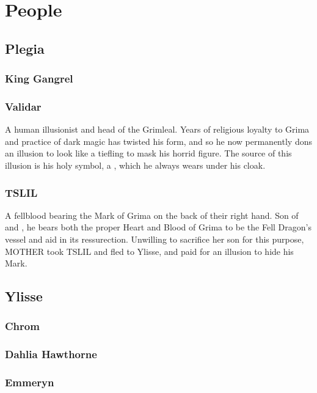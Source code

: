 
\section{People}
\subsection{Plegia}
\subsubsection{King Gangrel}
\label{people:gangrel}

\subsubsection{Validar}
\label{people:validar}
A human illusionist and head of the Grimleal. Years of religious loyalty to Grima and practice of dark magic has twisted his form, and so he now permanently dons an illusion to look like a tiefling to mask his horrid figure. The source of this illusion is his holy symbol, a , which he always wears under his cloak.


\subsubsection{TSLIL}
\label{people:tslil}
A fellblood bearing the Mark of Grima on the back of their right hand. Son of  and , he bears both the proper Heart and Blood of Grima to be the Fell Dragon's vessel and aid in its ressurection. Unwilling to sacrifice her son for this purpose, MOTHER took TSLIL and fled to Ylisse, and paid for an illusion to hide his Mark. 

\subsection{Ylisse}
\subsubsection{Chrom}
\label{people:chrom}


\subsubsection{Dahlia Hawthorne}
\label{people:dahlia}

\subsubsection{Emmeryn}
\label{people:emmeryn}


